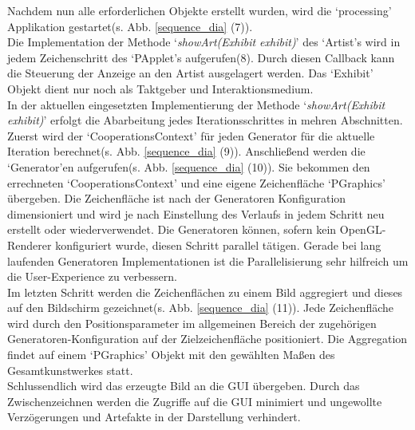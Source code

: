 \documentclass[../mciAusarbeitung.tex]{subfiles}
\begin{document}
	 Nachdem nun alle erforderlichen Objekte erstellt wurden, wird die `processing' Applikation gestartet(s. Abb. \ref{sequence_dia} (7)).\\
	Die Implementation der Methode `\textit{showArt(Exhibit exhibit)}' des `Artist's wird in jedem Zeichenschritt des `PApplet's aufgerufen(8). Durch diesen Callback kann die Steuerung der Anzeige an den Artist ausgelagert werden. Das `Exhibit' Objekt dient nur noch als Taktgeber und Interaktionsmedium.\\
	In der aktuellen eingesetzten Implementierung der Methode `\textit{showArt(Exhibit exhibit)}' erfolgt die Abarbeitung jedes Iterationsschrittes in mehren Abschnitten.\\
	Zuerst wird der `CooperationsContext' für jeden Generator für die aktuelle Iteration berechnet(s. Abb. \ref{sequence_dia} (9)). Anschließend werden die `Generator'en aufgerufen(s. Abb. \ref{sequence_dia} (10)). Sie bekommen den errechneten `CooperationsContext' und eine eigene Zeichenfläche `PGraphics' übergeben. Die Zeichenfläche ist nach der Generatoren Konfiguration dimensioniert und wird je nach Einstellung des Verlaufs in jedem Schritt neu erstellt oder wiederverwendet. Die Generatoren können, sofern kein OpenGL-Renderer konfiguriert wurde, diesen Schritt parallel tätigen. Gerade bei lang laufenden Generatoren Implementationen ist die Parallelisierung sehr hilfreich um die User-Experience zu verbessern.\\
	Im letzten Schritt werden die Zeichenflächen zu einem Bild aggregiert und dieses auf den Bildschirm gezeichnet(s. Abb. \ref{sequence_dia} (11)). Jede Zeichenfläche wird durch den Positionsparameter im allgemeinen Bereich der zugehörigen Generatoren-Konfiguration auf der Zielzeichenfläche positioniert. Die Aggregation findet auf einem `PGraphics' Objekt mit den gewählten Maßen des Gesamtkunstwerkes statt.\\
	Schlussendlich wird das erzeugte Bild an die GUI übergeben. Durch das Zwischenzeichnen werden die Zugriffe auf die GUI minimiert und ungewollte Verzögerungen und Artefakte in der Darstellung verhindert.
 
\end{document}

